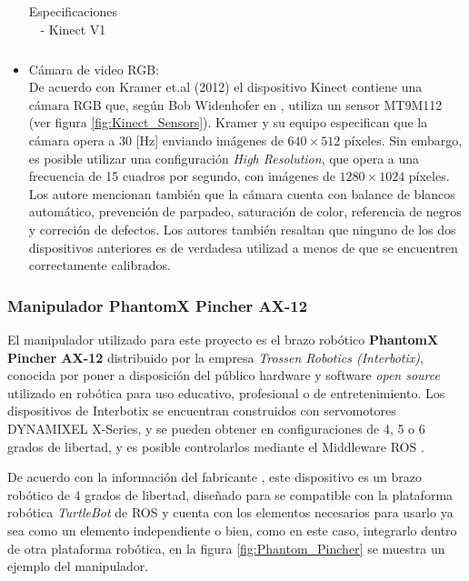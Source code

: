 \begin{itemize}
\begin{table}
\begin{tabular}{|c|c|}
                \hline
                \end{tabular}
                \caption{Especificaciones - Kinect V1}
                \label{tab:Kinect_especs}
            \end{table}

            \item Cámara de video RGB: \\
            De acuerdo con Kramer et.al (2012) \cite{kramer_hacking_2012} el dispositivo Kinect contiene una cámara RGB que, según Bob Widenhofer en \cite{eetimes_inside_2010}, utiliza un sensor MT9M112 (ver figura \ref{fig:Kinect_Sensors}). Kramer y su equipo especifican que la cámara opera a 30 [Hz] enviando imágenes de $640\times512$ píxeles. Sin embargo, es posible utilizar una configuración \textit{High Resolution}, que opera a una frecuencia de 15 cuadros por segundo, con imágenes de $1280\times1024$ píxeles. Los autore mencionan también que la cámara cuenta con balance de blancos automático, prevención de parpadeo, saturación de color, referencia de negros y correción de defectos. Los autores también resaltan que ninguno de los dos dispositivos anteriores es de verdadesa utilizad a menos de que se encuentren correctamente calibrados. 
            \end{itemize}
            
            \subsubsection{Manipulador PhantomX Pincher AX-12}
            El manipulador utilizado para este proyecto es el brazo robótico \textbf{PhantomX Pincher AX-12} distribuido por la empresa \textit{Trossen Robotics (Interbotix)}, conocida por poner a disposición del público hardware y software \textit{open source} utilizado en robótica para uso educativo, profesional o de entretenimiento. Los dispositivos de Interbotix se encuentran construidos con servomotores DYNAMIXEL X-Series, y se pueden obtener en configuraciones de 4, 5 o 6 grados de libertad, y es posible controlarlos mediante el Middleware ROS \cite{Interbotix_interbotix}. 
            
            De acuerdo con la información del fabricante \cite{Interbotix_widowx_PincherArm}, este dispositivo es un brazo robótico de 4 grados de libertad, diseñado para se compatible con la plataforma robótica \textit{TurtleBot} de ROS y cuenta con los elementos necesarios para usarlo ya sea como un elemento independiente o bien, como en este caso, integrarlo dentro de otra plataforma robótica, en la figura \ref{fig:Phantom_Pincher} se muestra un ejemplo del manipulador.\newpage
            
